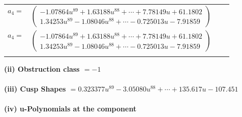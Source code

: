 \documentclass[1p]{elsarticle_modified}
\theoremstyle{definition}
\begin{document}
\begin{tabular}{m{7pt} m{180pt} m{7pt} m{180pt} }
\flushright $a_{4}=$&$\begin{pmatrix}-1.07864 u^{89}+1.63188 u^{88}+\cdots+7.78149 u+61.1802\\1.34253 u^{89}-1.08046 u^{88}+\cdots-0.725013 u-7.91859\end{pmatrix}$\\ \flushright $a_{4}=$&$\begin{pmatrix}-1.07864 u^{89}+1.63188 u^{88}+\cdots+7.78149 u+61.1802\\1.34253 u^{89}-1.08046 u^{88}+\cdots-0.725013 u-7.91859\end{pmatrix}$\\&\end{tabular}
\flushleft \textbf{(ii) Obstruction class $= -1$}\\~\\
\flushleft \textbf{(iii) Cusp Shapes $= 0.323377 u^{89}-3.05080 u^{88}+\cdots+135.617 u-107.451$}\\~\\
\newpage\renewcommand{\arraystretch}{1}
\flushleft \textbf{(iv) u-Polynomials at the component}\newline \\
\end{document}

